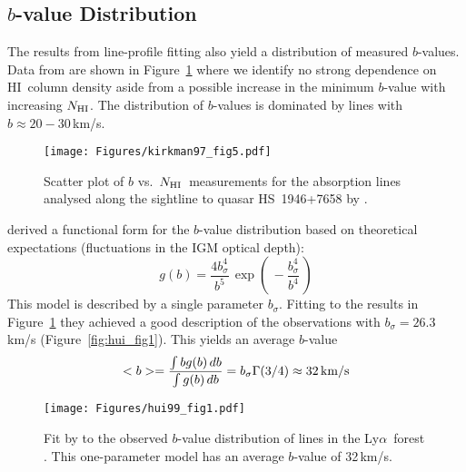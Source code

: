 \documentclass[graybox]{svmult}
\newcommand{\HI}{H{\sc I}}
\def\lya{Ly$\alpha$}
\def\ltp{\left ( \,}
\def\rtp{\, \right  ) }
\newcommand{\mnhi}{N_{\rm HI}}
\newcommand{\nhi}{$\mnhi$}
\begin{document}
\subsection{$b$-value Distribution}

The results from  line-profile fitting also yield 
a distribution of measured $b$-values.
Data from \cite{kt97} are shown in 
Figure~\ref{fig:kt97_bN_scatter} where we identify
no strong dependence on \HI\ column density aside from
a possible increase in the minimum $b$-value with increasing \nhi.
The distribution of $b$-values is dominated by lines with
$b \approx 20-30$\,km/s.

%
\begin{figure}[b]
\sidecaption
\texttt{[image: Figures/kirkman97\_fig5.pdf]}
%
%
\caption{Scatter plot of $b$ vs.\ \nhi\ measurements for
the absorption lines analysed along the sightline
to quasar HS~1946+7658 by \cite{kt97}.
}
\label{fig:kt97_bN_scatter}       %
\end{figure}

\cite{hr99} derived a functional form for the $b$-value
distribution based on theoretical expectations (fluctuations
in the IGM optical depth):
\begin{equation}
g(b) = \frac{4 b_\sigma^4}{b^5} \, \exp \ltp - \frac{b_\sigma^4}{b^4} \rtp
\end{equation}
This model is described by a single parameter $b_\sigma$.
Fitting to the results in Figure~\ref{fig:kt97_bN_scatter}
they achieved a 
good description of the observations with $b_\sigma = 26.3$ km/s
(Figure~\ref{fig:hui_fig1}).
This yields an average $b$-value
\begin{equation}
<b> = \frac{\int b g(b) \, db}{\int g(b) \, db} = b_\sigma \Gamma(3/4)
\approx 32 \, {\rm km/s}
\end{equation}

%
\begin{figure}[b]
\sidecaption
\texttt{[image: Figures/hui99\_fig1.pdf]}
%
%
\caption{Fit by \cite{hr99} to the observed $b$-value distribution of
lines in the \lya\ forest \cite{kt97}.  This one-parameter
model has an average $b$-value of 32\,km/s.
}
\label{fig:hui99_fig1}       %
\end{figure}
\end{document}
